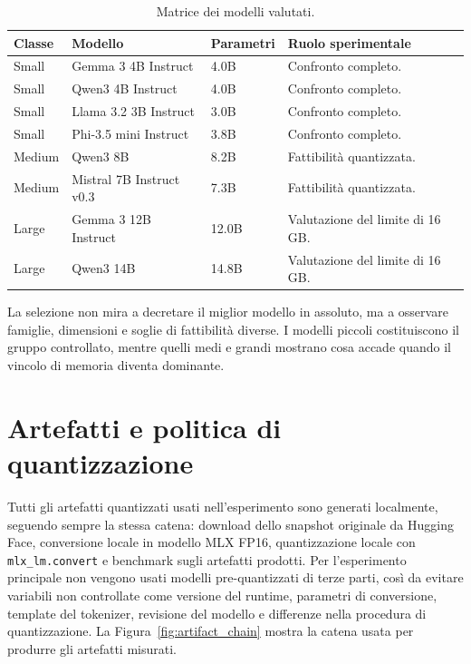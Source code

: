 \begin{table}[ht]
  \centering
  \caption{Matrice dei modelli valutati.}
  \label{tab:model_matrix}
  \small
  \begin{tabular}{L{2.4cm}L{3.5cm}L{2.0cm}L{4.6cm}}
    \toprule
    \textbf{Classe} & \textbf{Modello} & \textbf{Parametri} & \textbf{Ruolo sperimentale} \\
    \midrule
    Small & Gemma 3 4B Instruct & 4.0B
      & Confronto completo. \\
    Small & Qwen3 4B Instruct & 4.0B
      & Confronto completo. \\
    Small & Llama 3.2 3B Instruct & 3.0B
      & Confronto completo. \\
    Small & Phi-3.5 mini Instruct & 3.8B
      & Confronto completo. \\
    Medium & Qwen3 8B & 8.2B
      & Fattibilità quantizzata. \\
    Medium & Mistral 7B Instruct v0.3 & 7.3B
      & Fattibilità quantizzata. \\
    Large & Gemma 3 12B Instruct & 12.0B
      & Valutazione del limite di 16 GB. \\
    Large & Qwen3 14B & 14.8B
      & Valutazione del limite di 16 GB. \\
    \bottomrule
  \end{tabular}
\end{table}

La selezione non mira a decretare il miglior modello in assoluto, ma a osservare
famiglie, dimensioni e soglie di fattibilità diverse. I modelli piccoli
costituiscono il gruppo controllato, mentre quelli medi e grandi mostrano cosa
accade quando il vincolo di memoria diventa dominante.

\section{Artefatti e politica di quantizzazione}
\label{sec:experimental_artifact_policy}

Tutti gli artefatti quantizzati usati nell'esperimento sono generati localmente,
seguendo sempre la stessa catena: download dello snapshot originale da Hugging
Face, conversione locale in modello MLX FP16, quantizzazione locale con
\texttt{mlx\_lm.convert} e benchmark sugli artefatti prodotti. Per
l'esperimento principale non vengono usati modelli pre-quantizzati di terze
parti, così da evitare variabili non controllate come versione del runtime,
parametri di conversione, template del tokenizer, revisione del modello e
differenze nella procedura di quantizzazione.
La Figura~\ref{fig:artifact_chain} mostra la catena usata per produrre gli
artefatti misurati.

